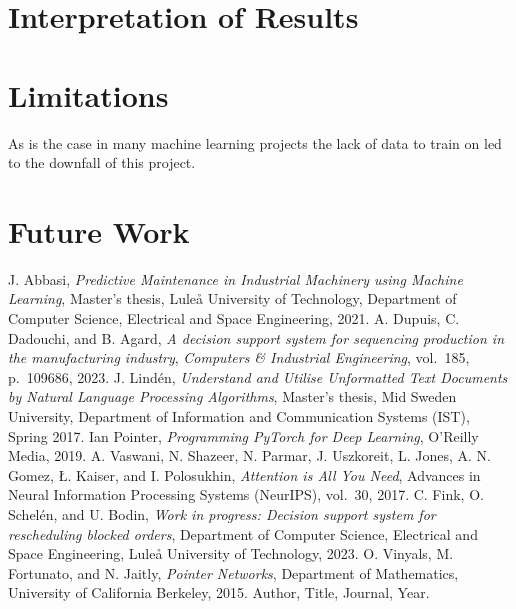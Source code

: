 \documentclass[12pt,a4paper]{report}
\begin{document}
\section{Interpretation of Results}
\section{Limitations}
    As is the case in many machine learning projects the lack of data to train on led to the downfall of this project.
\section{Future Work}


\begin{thebibliography}{99}
J. Abbasi, \textit{Predictive Maintenance in Industrial Machinery using Machine Learning}, 
Master’s thesis, Luleå University of Technology, Department of Computer Science, Electrical and Space Engineering, 2021.
A. Dupuis, C. Dadouchi, and B. Agard, 
        \textit{A decision support system for sequencing production in the manufacturing industry},
\textit{Computers \& Industrial Engineering}, vol.~185, p.~109686, 2023. 
 J. Lindén, 
    \textit{Understand and Utilise Unformatted Text Documents by Natural Language Processing Algorithms}, 
    Master’s thesis, Mid Sweden University, Department of Information and Communication Systems (IST), Spring 2017.
 Ian Pointer,
\textit{Programming PyTorch for Deep Learning},
O'Reilly Media, 2019.
A. Vaswani, N. Shazeer, N. Parmar, J. Uszkoreit, L. Jones, 
A. N. Gomez, Ł. Kaiser, and I. Polosukhin, 
\textit{Attention is All You Need}, Advances in Neural Information Processing Systems (NeurIPS), vol.~30, 2017.
C. Fink, O. Schelén, and U. Bodin, 
\textit{Work in progress: Decision support system for rescheduling blocked orders}, 
Department of Computer Science, Electrical and Space Engineering, Luleå University of Technology, 2023.
 O. Vinyals, M. Fortunato, and N. Jaitly, 
    \textit{Pointer Networks}, 
    Department of Mathematics, University of California Berkeley, 2015.
 Author, Title, Journal, Year.
\end{thebibliography}
\end{document}
